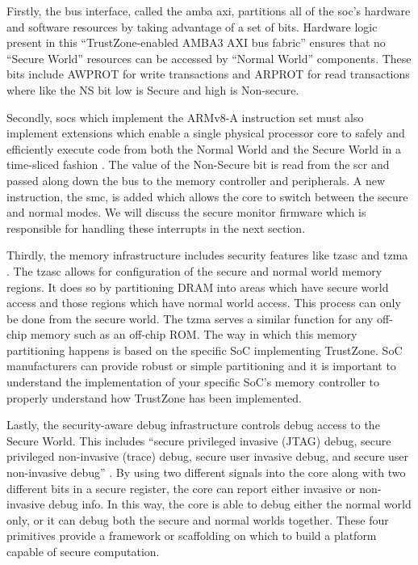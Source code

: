 Firstly, the bus interface, called the \gls{amba} \gls{axi}, partitions all of the \gls{soc}’s hardware and software resources by taking advantage of a set of bits. Hardware logic present in this ``TrustZone-enabled AMBA3 AXI  bus fabric'' \cite{ArmBuildingSS} ensures that no ``Secure World'' resources can be accessed by ``Normal World'' components. These bits include AWPROT for write transactions and ARPROT for read transactions where like the NS bit low is Secure and high is Non-secure. 

Secondly, \gls{soc}s which implement the ARMv8-A instruction set must also implement extensions which enable a single physical processor core to safely and efficiently execute code from both the Normal World and the Secure World in a time-sliced fashion \cite{TrustZoneExplained}. The value of the Non-Secure bit is read from the \gls{scr} and passed along down the bus to the memory controller and peripherals. A new instruction, the \gls{smc}, is added which allows the core to switch between the secure and normal modes. We will discuss the secure monitor firmware which is responsible for handling these interrupts in the next section.

Thirdly, the memory infrastructure includes security features like \gls{tzasc} and \gls{tzma} \cite{TrustZoneExplained}. The \gls{tzasc} allows for configuration of the secure and normal world memory regions. It does so by partitioning DRAM into areas which have secure world access and those regions which have normal world access. This process can only be done from the secure world. The \gls{tzma} serves a similar function for any off-chip memory such as an off-chip ROM. The way in which this memory partitioning happens is based on the specific SoC implementing TrustZone. SoC manufacturers can provide robust or simple partitioning and it is important to understand the implementation of your specific SoC's memory controller to properly understand how TrustZone has been implemented.

Lastly, the security-aware debug infrastructure controls debug access to the Secure World. This includes ``secure privileged invasive (JTAG) debug, secure privileged non-invasive (trace) debug, secure user invasive debug, and secure user non-invasive debug'' \cite{ArmBuildingSS}. By using two different signals into the core along with two different bits in a secure register, the core can report either invasive or non-invasive debug info. In this way, the core is able to debug either the normal world only, or it can debug both the secure and normal worlds together. These four primitives provide a framework or scaffolding on which to build a platform capable of secure computation.

